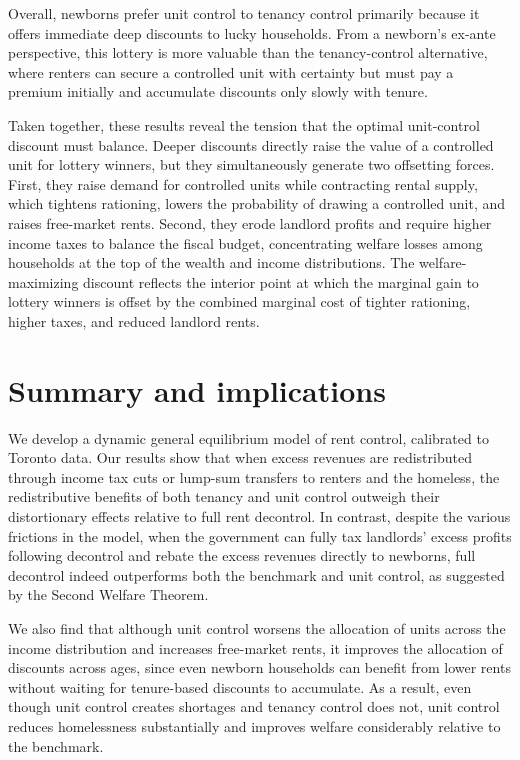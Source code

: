 \documentclass[parskip=full]{article}
\begin{document}
Overall, newborns prefer unit control to tenancy control primarily because it offers immediate deep discounts to lucky households. From a newborn's ex-ante perspective, this lottery is more valuable than the tenancy-control alternative, where renters can secure a controlled unit with certainty but must pay a premium initially and accumulate discounts only slowly with tenure.

Taken together, these results reveal the tension that the optimal unit-control discount must balance. Deeper discounts directly raise the value of a controlled unit for lottery winners, but they simultaneously generate two offsetting forces. First, they raise demand for controlled units while contracting rental supply, which tightens rationing, lowers the probability of drawing a controlled unit, and raises free-market rents. Second, they erode landlord profits and require higher income taxes to balance the fiscal budget, concentrating welfare losses among households at the top of the wealth and income distributions. The welfare-maximizing discount reflects the interior point at which the marginal gain to lottery winners is offset by the combined marginal cost of tighter rationing, higher taxes, and reduced landlord rents.

\section{Summary and implications}\label{sec:conclusion}

We develop a dynamic general equilibrium model of rent control, calibrated to Toronto data. Our results show that when excess revenues are redistributed through income tax cuts or lump-sum transfers to renters and the homeless, the redistributive benefits of both tenancy and unit control outweigh their distortionary effects relative to full rent decontrol. In contrast, despite the various frictions in the model, when the government can fully tax landlords' excess profits following decontrol and rebate the excess revenues directly to newborns, full decontrol indeed outperforms both the benchmark and unit control, as suggested by the Second Welfare Theorem.

We also find that although unit control worsens the allocation of units across the income distribution and increases free-market rents, it improves the allocation of discounts across ages, since even newborn households can benefit from lower rents without waiting for tenure-based discounts to accumulate. As a result, even though unit control creates shortages and tenancy control does not, unit control reduces homelessness substantially and improves welfare considerably relative to the benchmark. 
\end{document}
